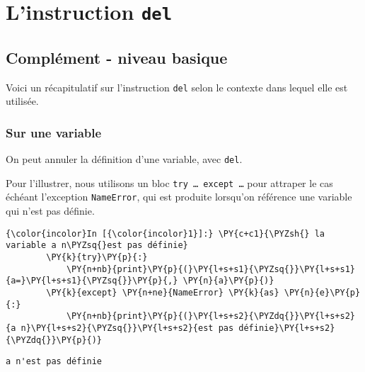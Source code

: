     
    
    
    

    

    \hypertarget{linstruction-del}{%
\section{\texorpdfstring{L'instruction
\texttt{del}}{L'instruction del}}\label{linstruction-del}}

    \hypertarget{compluxe9ment---niveau-basique}{%
\subsection{Complément - niveau
basique}\label{compluxe9ment---niveau-basique}}

    Voici un récapitulatif sur l'instruction \texttt{del} selon le contexte
dans lequel elle est utilisée.

    \hypertarget{sur-une-variable}{%
\subsubsection{Sur une variable}\label{sur-une-variable}}

    On peut annuler la définition d'une variable, avec \texttt{del}.

Pour l'illustrer, nous utilisons un bloc
\texttt{try\ \ldots{}\ except\ \ldots{}} pour attraper le cas échéant
l'exception \texttt{NameError}, qui est produite lorsqu'on référence une
variable qui n'est pas définie.

    \begin{Verbatim}[commandchars=\\\{\},frame=single,framerule=0.3mm,rulecolor=\color{cellframecolor}]
{\color{incolor}In [{\color{incolor}1}]:} \PY{c+c1}{\PYZsh{} la variable a n\PYZsq{}est pas définie}
        \PY{k}{try}\PY{p}{:}
            \PY{n+nb}{print}\PY{p}{(}\PY{l+s+s1}{\PYZsq{}}\PY{l+s+s1}{a=}\PY{l+s+s1}{\PYZsq{}}\PY{p}{,} \PY{n}{a}\PY{p}{)}
        \PY{k}{except} \PY{n+ne}{NameError} \PY{k}{as} \PY{n}{e}\PY{p}{:}
            \PY{n+nb}{print}\PY{p}{(}\PY{l+s+s2}{\PYZdq{}}\PY{l+s+s2}{a n}\PY{l+s+s2}{\PYZsq{}}\PY{l+s+s2}{est pas définie}\PY{l+s+s2}{\PYZdq{}}\PY{p}{)}
\end{Verbatim}


    \begin{Verbatim}[commandchars=\\\{\},frame=single,framerule=0.3mm,rulecolor=\color{cellframecolor}]
a n'est pas définie
\end{Verbatim}


